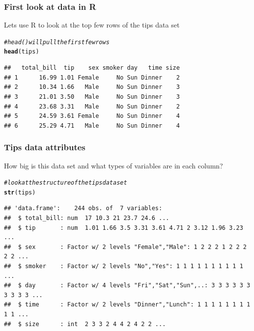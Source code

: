 \documentclass{beamer}\usepackage[]{graphicx}\usepackage[]{color}
\makeatletter
\newcommand{\hlcom}[1]{\textcolor[rgb]{0.678,0.584,0.686}{\textit{#1}}}%
\newcommand{\hlstd}[1]{\textcolor[rgb]{0.345,0.345,0.345}{#1}}%
\newcommand{\hlkwd}[1]{\textcolor[rgb]{0.737,0.353,0.396}{\textbf{#1}}}%
\newenvironment{kframe}{%
 \def\at@end@of@kframe{}%
 \ifinner\ifhmode%
  \def\at@end@of@kframe{\end{minipage}}%
  \begin{minipage}{\columnwidth}%
 \fi\fi%
 \def\FrameCommand##1{\hskip\@totalleftmargin \hskip-\fboxsep
 \colorbox{shadecolor}{##1}\hskip-\fboxsep
     \hskip-\linewidth \hskip-\@totalleftmargin \hskip\columnwidth}%
 \MakeFramed {\advance\hsize-\width
   \@totalleftmargin\z@ \linewidth\hsize
   \@setminipage}}%
 {\par\unskip\endMakeFramed%
 \at@end@of@kframe}
\newenvironment{knitrout}{}{} %
\makeatother
\begin{document}
\begin{frame}[fragile]
    \frametitle{First look at data in R}
    
    Lets use R to look at the top few rows of the tips data set 
    
    \small
\begin{knitrout}\footnotesize
{}\color{fgcolor}\begin{kframe}
\begin{alltt}
\hlcom{# head() will pull the first few rows}
\hlkwd{head}\hlstd{(tips)}
\end{alltt}
\begin{verbatim}
##   total_bill  tip    sex smoker day   time size
## 1      16.99 1.01 Female     No Sun Dinner    2
## 2      10.34 1.66   Male     No Sun Dinner    3
## 3      21.01 3.50   Male     No Sun Dinner    3
## 4      23.68 3.31   Male     No Sun Dinner    2
## 5      24.59 3.61 Female     No Sun Dinner    4
## 6      25.29 4.71   Male     No Sun Dinner    4
\end{verbatim}
\end{kframe}
\end{knitrout}

    \normalsize
\end{frame}


\begin{frame}[fragile]
    \frametitle{Tips data attributes}
    
How big is this data set and what types of variables are in each column?

    \small
\begin{knitrout}\footnotesize
{}\color{fgcolor}\begin{kframe}
\begin{alltt}
\hlcom{# look at the structure of the tips data set}
\hlkwd{str}\hlstd{(tips)}
\end{alltt}
\begin{verbatim}
## 'data.frame':	244 obs. of  7 variables:
##  $ total_bill: num  17 10.3 21 23.7 24.6 ...
##  $ tip       : num  1.01 1.66 3.5 3.31 3.61 4.71 2 3.12 1.96 3.23 ...
##  $ sex       : Factor w/ 2 levels "Female","Male": 1 2 2 2 1 2 2 2 2 2 ...
##  $ smoker    : Factor w/ 2 levels "No","Yes": 1 1 1 1 1 1 1 1 1 1 ...
##  $ day       : Factor w/ 4 levels "Fri","Sat","Sun",..: 3 3 3 3 3 3 3 3 3 3 ...
##  $ time      : Factor w/ 2 levels "Dinner","Lunch": 1 1 1 1 1 1 1 1 1 1 ...
##  $ size      : int  2 3 3 2 4 4 2 4 2 2 ...
\end{verbatim}
\end{kframe}
\end{knitrout}

    \normalsize
\end{frame}
\end{document}
